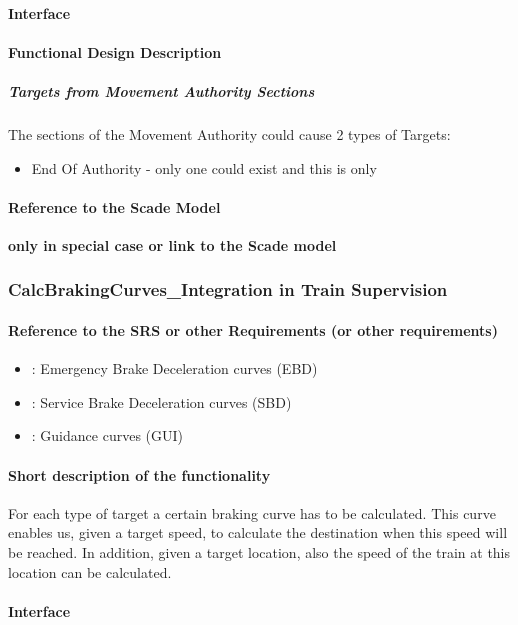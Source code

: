\paragraph{Interface}

\paragraph{Functional Design Description}
\subparagraph{Targets from Movement Authority Sections}
The sections of the Movement Authority could cause 2 types of Targets:
\begin{itemize}
\item End Of Authority - only one could exist and this is only 
\end{itemize}

\paragraph{Reference to the Scade Model}
\textbf{only in special case or link to the Scade model}

\subsubsection{CalcBrakingCurves\_Integration in Train Supervision} 
\paragraph{Reference to the SRS or other Requirements (or other requirements)}
\begin{itemize}
	\item \cite[Chapt.~3.13.8.3]{subset-026}: Emergency Brake Deceleration curves (EBD)
	\item \cite[Chapt.~3.13.8.4]{subset-026}: Service Brake Deceleration curves (SBD)
	\item \cite[Chapt.~3.13.8.5]{subset-026}: Guidance curves (GUI)
\end{itemize}
\paragraph{Short description of the functionality}
For each type of target a certain braking curve has to be calculated. This curve enables us, given a target speed, to calculate the destination when this speed will be reached. In addition, given a target location, also the speed of the train at this location can be calculated. 
\paragraph{Interface}
